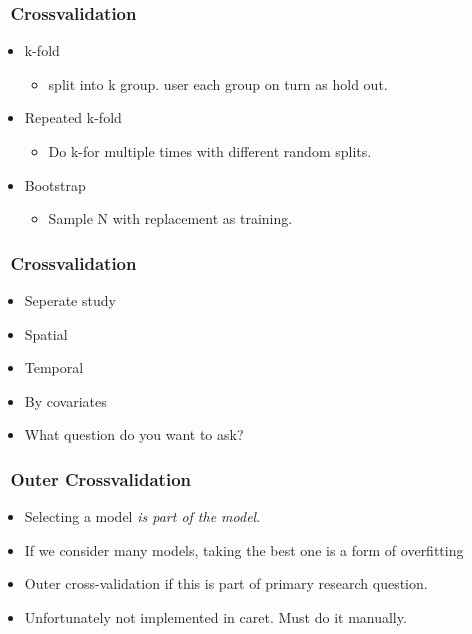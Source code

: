 \documentclass[handout, aspectratio = 169]{beamer}
\begin{document}
\begin{frame}
\frametitle{\insertframenumber~Crossvalidation}

\begin{itemize}
\item k-fold
\begin{itemize}
\item split into k group. user each group on turn as hold out.
\end{itemize}
\item Repeated k-fold
\begin{itemize}
\item Do k-for multiple times with different random splits.
\end{itemize}
\item Bootstrap
\begin{itemize}
\item Sample N with replacement as training.
\end{itemize}
\end{itemize}
\end{frame} 

\begin{frame}
\frametitle{\insertframenumber~Crossvalidation}

\begin{itemize}
\item Seperate study
\item Spatial
\item Temporal
\item By covariates
\item What question do you want to ask?
\end{itemize}
\end{frame} 


\begin{frame}
\frametitle{\insertframenumber~Outer Crossvalidation}

\begin{itemize}
\item Selecting a model \emph{is part of the model}.
\item If we consider many models, taking the best one is a form of overfitting
\item Outer cross-validation if this is part of primary research question.
\item Unfortunately not implemented in caret. Must do it manually.
\end{itemize}
\end{frame} 
\end{document}
